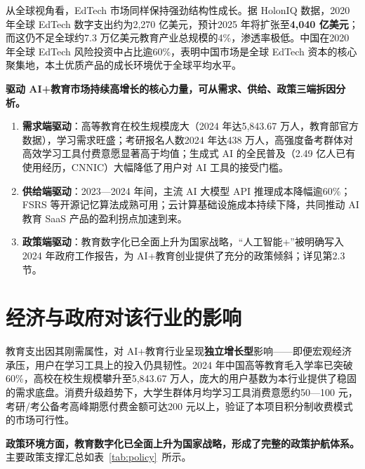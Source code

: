 从全球视角看，EdTech 市场同样保持强劲结构性成长。据 HolonIQ 数据，2020 年全球 EdTech 数字支出约为2,270 亿美元，预计2025 年将扩张至\textbf{4,040 亿美元}；而这仍不足全球约7.3 万亿美元教育产业总规模的4\%，渗透率极低。中国在2020 年全球 EdTech 风险投资中占比逾60\%，表明中国市场是全球 EdTech 资本的核心聚集地，本土优质产品的成长环境优于全球平均水平。

\textbf{驱动 AI+教育市场持续高增长的核心力量，可从需求、供给、政策三端拆因分析。}

\begin{enumerate}[leftmargin=2em]
  \item \textbf{需求端驱动}：高等教育在校生规模庞大（2024 年达5,843.67 万人，教育部官方数据），学习需求旺盛；考研报名人数2024 年达438 万人，高强度备考群体对高效学习工具付费意愿显著高于均值；生成式 AI 的全民普及（2.49 亿人已有使用经历，CNNIC）大幅降低了用户对 AI 工具的接受门槛。
  \item \textbf{供给端驱动}：2023—2024 年间，主流 AI 大模型 API 推理成本降幅逾60\%；FSRS 等开源记忆算法成熟可用；云计算基础设施成本持续下降，共同推动 AI 教育 SaaS 产品的盈利拐点加速到来。
  \item \textbf{政策端驱动}：教育数字化已全面上升为国家战略，“人工智能+”被明确写入2024 年政府工作报告，为 AI+教育创业提供了充分的政策倾斜；详见第2.3 节。
\end{enumerate}

\section{经济与政府对该行业的影响}

教育支出因其刚需属性，对 AI+教育行业呈现\textbf{独立增长型}影响——即便宏观经济承压，用户在学习工具上的投入仍具韧性。2024 年中国高等教育毛入学率已突破60\%，高校在校生规模攀升至5,843.67 万人，庞大的用户基数为本行业提供了稳固的需求底盘。消费升级趋势下，大学生群体月均学习工具消费意愿约50—100 元，考研/考公备考高峰期愿付费金额可达200 元以上，验证了本项目积分制收费模式的市场可行性。

\textbf{政策环境方面，教育数字化已全面上升为国家战略，形成了完整的政策护航体系。}主要政策支撑汇总如表~\ref{tab:policy}~所示。

